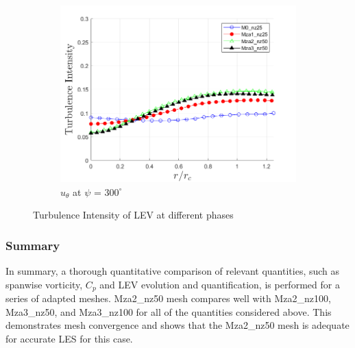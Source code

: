 \begin{figure}[H]
\begin{subfigure}[b]{0.475\textwidth}
		\centering
		\includegraphics[width=1\textwidth]{figures/zonal_adapt_results/LEV/u_theta/TI_phase_300.png}
		\caption{$u_\theta$ at $\psi$ = $300^\circ$}
		\label{fig:zonal_TI_300}
	\end{subfigure}
	\caption{ Turbulence Intensity of LEV at different phases}
	\label{fig:zonal_TI_plots_LEV}
\end{figure}

\subsubsection{Summary}
In summary, a thorough quantitative comparison of relevant quantities, such as spanwise vorticity, $C_p$ and LEV evolution and quantification, is performed for a series of adapted meshes. Mza2\_nz50 mesh compares well with Mza2\_nz100, Mza3\_nz50, and Mza3\_nz100 for all of the quantities considered above. This demonstrates mesh convergence and shows that the Mza2\_nz50 mesh is adequate for accurate LES for this case.